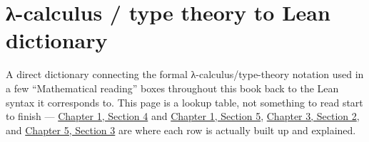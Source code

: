 \chapter*{λ-calculus / type theory to Lean dictionary}
\setcounter{section}{0}\label{sec:root:lambda-calculus-dictionary:1}

A direct dictionary connecting the formal λ-calculus/type-theory notation used in a few ``Mathematical reading'' boxes throughout this book back to the Lean syntax it corresponds to. This page is a lookup table, not something to read start to finish --- \hyperref[sec:01-basics:04-terminology:1]{Chapter 1, Section 4} and \hyperref[sec:01-basics:05-pi-sigma-and-coc:1]{Chapter 1, Section 5}, \hyperref[sec:03-propositions-and-proofs:02-logic-recap:1]{Chapter 3, Section 2}, and \hyperref[sec:05-rigor-check:03-typing-rules-and-safety:1]{Chapter 5, Section 3} are where each row is actually built up and explained.

